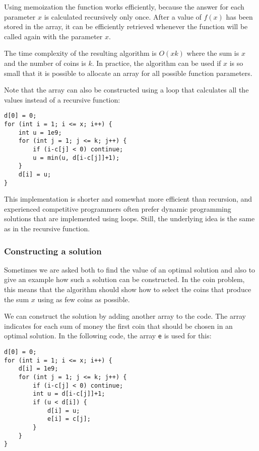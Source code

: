 Using memoization the function works
efficiently, because the answer for each parameter $x$
is calculated recursively only once.
After a value of $f(x)$ has been stored in the array,
it can be efficiently retrieved whenever the
function will be called again with the parameter $x$.

The time complexity of the resulting algorithm
is $O(xk)$ where the sum is $x$ and the number of
coins is $k$.
In practice, the algorithm can be used if
$x$ is so small that it is possible to allocate
an array for all possible function parameters.

Note that the array can also be constructed using
a loop that calculates all the values
instead of a recursive function:
\begin{lstlisting}
d[0] = 0;
for (int i = 1; i <= x; i++) {
    int u = 1e9;
    for (int j = 1; j <= k; j++) {
        if (i-c[j] < 0) continue;
        u = min(u, d[i-c[j]]+1);
    }
    d[i] = u;
}
\end{lstlisting}

This implementation is shorter and somewhat
more efficient than recursion,
and experienced competitive programmers
often prefer dynamic programming solutions
that are implemented using loops.
Still, the underlying idea is the same as
in the recursive function.

\subsubsection{Constructing a solution}

Sometimes we are asked both to find the value
of an optimal solution and also to give
an example how such a solution can be constructed.
In the coin problem, this means that the algorithm
should show how to select the coins that produce
the sum $x$ using as few coins as possible.

We can construct the solution by adding another
array to the code. The array indicates for
each sum of money the first coin that should be
chosen in an optimal solution.
In the following code, the array \texttt{e}
is used for this:

\begin{lstlisting}
d[0] = 0;
for (int i = 1; i <= x; i++) {
    d[i] = 1e9;
    for (int j = 1; j <= k; j++) {
        if (i-c[j] < 0) continue;
        int u = d[i-c[j]]+1;
        if (u < d[i]) {
            d[i] = u;
            e[i] = c[j];
        }
    }
}
\end{lstlisting}

